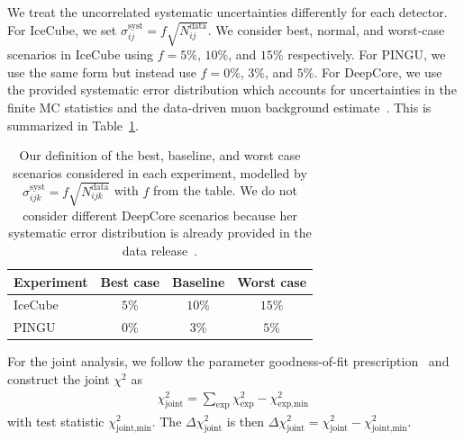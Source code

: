 We treat the uncorrelated systematic uncertainties differently for each detector. For IceCube, we set $\sigma_{ij}^\text{syst} = f\sqrt{N_{ij}^\text{data}}$.
We consider best, normal, and worst-case scenarios in IceCube using
$f=5\%$, $10\%$, and $15\%$ respectively. For PINGU, we use the same form but instead use $f=0\%$, $3\%$, and $5\%$.
For DeepCore, we use the provided systematic error distribution which accounts for uncertainties in the finite MC statistics and the data-driven 
muon background estimate~\cite{DC2019data}. This is summarized in Table~\ref{table:syst_errors}.
{\renewcommand{\arraystretch}{1.2}
\begin{table}
   \centering
   \begin{tabular}{lccc}
      \hline \hline
      Experiment & Best case & Baseline & Worst case \\
      \hline
      IceCube & $5\%$ & $10\%$ & $15\%$ \\
      PINGU & $0\%$ & $3\%$ & $5\%$ \\
      \hline \hline
   \end{tabular}
   \caption{Our definition of the best, baseline, and worst case scenarios considered in each experiment, modelled by $\sigma_{ijk}^\text{syst} = f\sqrt{N_{ijk}^\text{data}}$ with $f$ from the table.
   We do not consider different DeepCore scenarios because her systematic error distribution is already provided in the data release~\cite{DC2019data}.}\label{table:syst_errors}
\end{table}

For the joint analysis, we follow the parameter goodness-of-fit prescription~\cite{maltoni2003} and construct the joint $\chi^2$ as 
\begin{align}\label{eq:joint_chisq}
    \chi^2_\text{joint} = \sum_\text{exp}\chi^2_\text{exp} - \chi^2_\text{exp,min}\,
\end{align}
with test statistic $\chi^2_\text{joint,min}$. The $\Delta \chi^2_\text{joint}$ is then $\Delta \chi^2_\text{joint} = \chi^2_\text{joint} - \chi^2_\text{joint,min}$.

}
